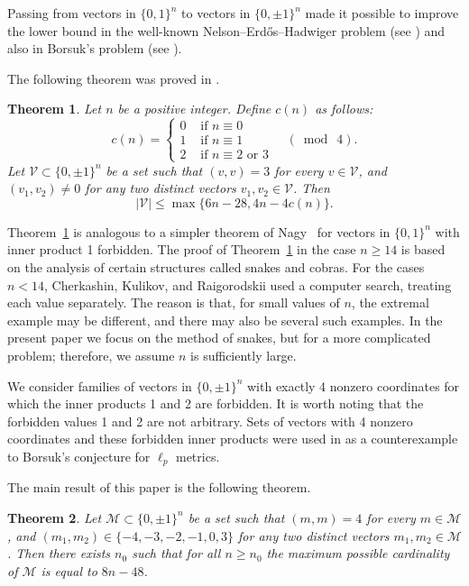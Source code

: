 \documentclass[12pt,a4paper]{article}
\newtheorem{theorem}{Theorem}
\begin{document}
Passing from vectors in $\{0,1\}^n$ to vectors in $\{0,\pm 1\}^n$ made it possible to improve the lower bound in the well-known Nelson--Erd\H{o}s--Hadwiger problem (see \cite{Rchrom}) and also in Borsuk's problem (see \cite{RB3}).

The following theorem was proved in \cite{CKR}.

\begin{theorem}\label{theoremCKR}
    Let $n$ be a positive integer. Define $c(n)$ as follows:
    $$ c(n)=\left\{\begin{array}{ll}
0 & \text { if } n \equiv 0 \\
1 & \text { if } n \equiv 1 \\
2 & \text { if } n \equiv 2 \text { or } 3
\end{array} \quad(\bmod \ 4) .\right.
$$
Let $\mathcal{V} \subset \{0,\pm 1\}^n$ be a set such that $(v,v)=3$ for every $v \in \mathcal{V}$, and $(v_1,v_2) \neq 0$ for any two distinct vectors $v_1,v_2 \in \mathcal{V}$. Then
$$|\mathcal{V}| \leqslant \max\{6n-28,4n-4c(n)\}.$$
\end{theorem}

Theorem~\ref{theoremCKR} is analogous to a simpler theorem of Nagy~\cite{Na} for vectors in $\{0,1\}^n$ with inner product 1 forbidden. The proof of Theorem~\ref{theoremCKR} in the case $n \geqslant 14$ is based on the analysis of certain structures called snakes and cobras. For the cases $n<14$, Cherkashin, Kulikov, and Raigorodskii used a computer search, treating each value separately. The reason is that, for small values of $n$, the extremal example may be different, and there may also be several such examples. In the present paper we focus on the method of snakes, but for a more complicated problem; therefore, we assume $n$ is sufficiently large.

We consider families of vectors in $\{0,\pm 1\}^n$ with exactly 4 nonzero coordinates for which the inner products 1 and 2 are forbidden. It is worth noting that the forbidden values 1 and 2 are not arbitrary. Sets of vectors with 4 nonzero coordinates and these forbidden inner products were used in \cite{RS} as a counterexample to Borsuk's conjecture for $\ell_p$ metrics.

The main result of this paper is the following theorem.

\begin{theorem}\label{bigtheorem}
    Let $\mathcal{M} \subset \{0,\pm 1\}^n$ be a set such that $(m,m)=4$ for every $m \in \mathcal{M}$, and $(m_1,m_2) \in \{-4, -3, -2, -1, 0, 3\}$ for any two distinct vectors $m_1,m_2 \in \mathcal{M}$. Then there exists $n_0$ such that for all $n \geqslant n_0$ the maximum possible cardinality of $\mathcal{M}$ is equal to $8n-48$.
\end{theorem}
\end{document}
